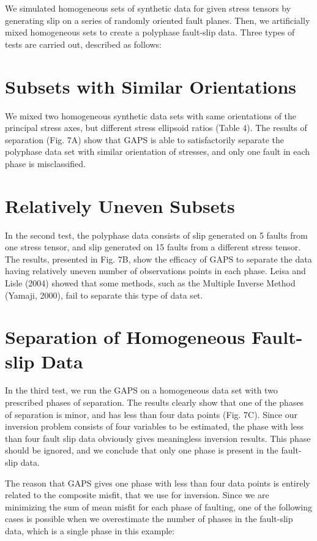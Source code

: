 \onehalfspacing
We simulated homogeneous sets of synthetic data for given stress tensors by generating slip on a series of randomly oriented fault planes. Then, we artificially mixed homogeneous sets to create a polyphase fault-slip data. Three types of tests are carried out, described as follows:

\section{Subsets with Similar Orientations}
We mixed two homogeneous synthetic data sets with same orientations of the principal stress axes, but different stress ellipsoid ratios (Table 4). The results of separation (Fig. 7A) show that GAPS is able to satisfactorily separate the polyphase data set with similar orientation of stresses, and only one fault in each phase is misclassified.

\section{Relatively Uneven Subsets}
In the second test, the polyphase data consists of slip generated on 5 faults from one stress tensor, and slip generated on 15 faults from a different stress tensor. The results, presented in Fig. 7B, show the efficacy of GAPS to separate the data having relatively uneven number of observations points in each phase.  Leisa and Lisle (2004) showed that some methods, such as the Multiple Inverse Method (Yamaji, 2000), fail to separate this type of data set.

\section{Separation of Homogeneous Fault-slip Data}
In the third test, we run the GAPS on a homogeneous data set with two prescribed phases of separation. The results clearly show that one of the phases of separation is minor, and has less than four data points (Fig. 7C). Since our inversion problem consists of four variables to be estimated, the phase with less than four fault slip data obviously gives meaningless inversion results. This phase should be ignored, and we conclude that only one phase is present in the fault-slip data. 

The reason that GAPS gives one phase with less than four data points is entirely related to the composite misfit, that we use for inversion. Since we are minimizing the sum of mean misfit for each phase of faulting, one of the following cases is possible when we overestimate the number of phases in the fault-slip data, which is a single phase in this example:

